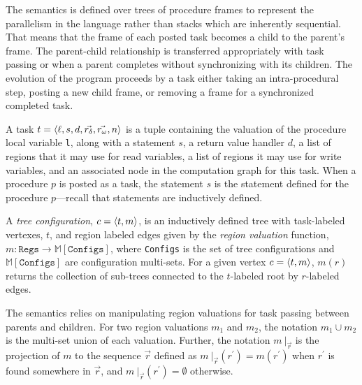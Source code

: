 
The semantics is defined over trees of procedure frames to represent the parallelism in the language rather than stacks which are inherently sequential. That means that the frame of each posted task becomes a child to the parent's frame. The parent-child relationship is transferred appropriately with task passing or when a parent completes without synchronizing with its children. The evolution of the program proceeds by a task either taking an intra-procedural step, posting a new child frame, or removing a frame for a synchronized completed task.

A task $t = \langle \ell, s, d, \vec{r_\delta}, \vec{r_\omega}, n \rangle $ is a tuple containing the valuation of the procedure local variable \texttt{l}, along with a statement $s$, a return value handler $d$, a list of regions that it may use for read variables, a list of regions it may use for write variables, and an associated node in the computation graph for this task. When a procedure $p$ is posted as a task, the statement $s$ is the statement defined for the procedure $p$---recall that statements are inductively defined. 

A \emph{tree configuration}, $c = \langle t,m \rangle $, is an inductively defined tree with task-labeled vertexes, $t$, and region labeled edges given by the \emph{region valuation} function, $m : \texttt{Regs} \rightarrow \mathbb{M}[\texttt{Configs}]$, where \texttt{Configs} is the set of tree configurations and $\mathbb{M}[\texttt{Configs}]$ are configuration multi-sets. For a given vertex $c = \langle t,m \rangle $, $m(r)$ returns the collection of sub-trees connected to the $t$-labeled root by $r$-labeled edges.

The semantics relies on manipulating region valuations for task passing between parents and children. For two region valuations $m_1$ and $m_2$, the notation $m_1 \cup m_2$ is the multi-set union of each valuation. Further, the notation $m\ |_{\vec{r}}$ is the projection of $m$ to the sequence $\vec{r}$ defined as $m\ |_{\vec{r}}(r^\prime) = m(r^\prime)$  when $r^\prime$ is found somewhere in $\vec{r}$, and $m\ |_{\vec{r}}(r^\prime) = \emptyset$ otherwise. 

